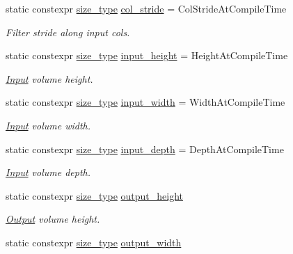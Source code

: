 \begin{DoxyCompactItemize}
static constexpr \hyperlink{namespaceffnn_a63b90a2fd70eb76684eac482a51633e5}{size\-\_\-type} \hyperlink{structffnn_1_1layer_1_1convolution__layer__traits_a36aab5cc1478feddd1085cf54b44246e}{col\-\_\-stride} = Col\-Stride\-At\-Compile\-Time
\begin{DoxyCompactList}\small\item\em Filter stride along input cols. \end{DoxyCompactList}\item 
static constexpr \hyperlink{namespaceffnn_a63b90a2fd70eb76684eac482a51633e5}{size\-\_\-type} \hyperlink{structffnn_1_1layer_1_1convolution__layer__traits_a94cdb215d2fa97936542f44551bea669}{input\-\_\-height} = Height\-At\-Compile\-Time
\begin{DoxyCompactList}\small\item\em \hyperlink{classffnn_1_1layer_1_1_input}{Input} volume height. \end{DoxyCompactList}\item 
static constexpr \hyperlink{namespaceffnn_a63b90a2fd70eb76684eac482a51633e5}{size\-\_\-type} \hyperlink{structffnn_1_1layer_1_1convolution__layer__traits_aeb9e3903c86bc692b6cee14434537e46}{input\-\_\-width} = Width\-At\-Compile\-Time
\begin{DoxyCompactList}\small\item\em \hyperlink{classffnn_1_1layer_1_1_input}{Input} volume width. \end{DoxyCompactList}\item 
static constexpr \hyperlink{namespaceffnn_a63b90a2fd70eb76684eac482a51633e5}{size\-\_\-type} \hyperlink{structffnn_1_1layer_1_1convolution__layer__traits_a508a1594a6f77f6f536744cd40e2b9fd}{input\-\_\-depth} = Depth\-At\-Compile\-Time
\begin{DoxyCompactList}\small\item\em \hyperlink{classffnn_1_1layer_1_1_input}{Input} volume depth. \end{DoxyCompactList}\item 
static constexpr \hyperlink{namespaceffnn_a63b90a2fd70eb76684eac482a51633e5}{size\-\_\-type} \hyperlink{structffnn_1_1layer_1_1convolution__layer__traits_a352db60c55310a92c32b68ecec8967db}{output\-\_\-height}
\begin{DoxyCompactList}\small\item\em \hyperlink{classffnn_1_1layer_1_1_output}{Output} volume height. \end{DoxyCompactList}\item 
static constexpr \hyperlink{namespaceffnn_a63b90a2fd70eb76684eac482a51633e5}{size\-\_\-type} \hyperlink{structffnn_1_1layer_1_1convolution__layer__traits_a8139122e587481fb9584f2b446e4ea11}{output\-\_\-width}

\end{DoxyCompactItemize}
